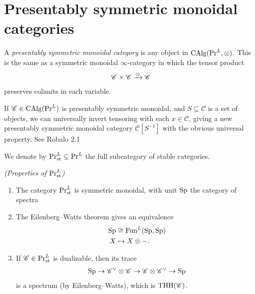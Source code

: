 \section{Presentably symmetric monoidal categories}



\begin{definition} A \textit{presentably symmetric monoidal category} is any object in $\mathrm{CAlg}(\mathrm{Pr}^L, \otimes)$. This is the same as a symmetric monoidal $\infty$-category in which the tensor product
\begin{align*}
    \mathscr{C} \times \mathscr{C} \xrightarrow{\otimes} \mathscr{C}
\end{align*}
preserves colimits in each variable.
\end{definition}

\begin{proposition} %
If $\mathscr{C} \in \mathrm{CAlg}(\mathrm{Pr}^L)$ is presentably symmetric monoidal, and $S \subseteq \mathscr{C}$ is a set of objects, we can universally invert tensoring with each $x\in \mathscr{C}$, giving a new presentably symmetric monoidal category $\mathscr{C}[S^{-1}]$ with the obvious universal property. See Robalo 2.1
\end{proposition}

\begin{notation} We denote by $\mathrm{Pr}_{\mathrm{st}}^L \subseteq \mathrm{Pr}^L$ the full subcategory of stable categories.
\end{notation}

\begin{proposition} \textit{(Properties of $\mathrm{Pr}^L_{\mathrm{st}}$)}
\begin{enumerate}
    \item The category $\mathrm{Pr}^L_{\mathrm{st}}$ is symmetric monoidal, with unit $\mathrm{Sp}$ the category of spectra
    \item The Eilenberg--Watts theorem gives an equivalence
    \begin{align*}
        \mathrm{Sp} &\cong \mathrm{Fun}^L(\mathrm{Sp},\mathrm{Sp}) \\
        X &\mapsto X \otimes-.
    \end{align*}
    \item If $\mathscr{C} \in \mathrm{Pr}^L_{\mathrm{st}}$ is dualizable, then its trace
    \begin{align*}
        \mathrm{Sp} \to \mathscr{C}^\vee \otimes \mathscr{C} \to \mathscr{C} \otimes \mathscr{C}^\vee \to \mathrm{Sp}
    \end{align*}
    is a spectrum (by Eilenberg--Watts), which is $\mathrm{THH}(\mathscr{C})$.
\end{enumerate}
\end{proposition}



